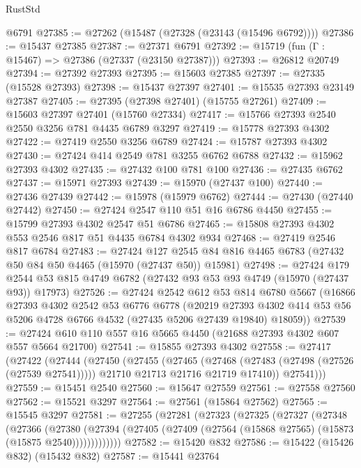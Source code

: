 \begin{lexlean}{RustStd}
\begin{coremodule}
    @6791
@27385 := @27262 (@15487 (@27328 (@23143 (@15496 @6792))))
@27386 := @15437 @27385
@27387 := @27371 @6791
@27392 := @15719 (fun (Γ : @15467) => @27386 (@27337 (@23150 @27387)))
@27393 := @26812 @20749
@27394 := @27392 @27393
@27395 := @15603 @27385
@27397 := @27335 (@15528 @27393)
@27398 := @15437 @27397
@27401 := @15535 @27393 @23149 @27387
@27405 := @27395 (@27398 @27401) (@15755 @27261)
@27409 := @15603 @27397 @27401 (@15760 @27334)
@27417 := @15766 @27393 @2540 @2550 @3256 @781 @4435 @6789 @3297
@27419 := @15778 @27393 @4302
@27422 := @27419 @2550 @3256 @6789
@27424 := @15787 @27393 @4302
@27430 := @27424 @414 @2549 @781 @3255 @6762 @6788
@27432 := @15962 @27393 @4302
@27435 := @27432 @100 @781 @100
@27436 := @27435 @6762
@27437 := @15971 @27393
@27439 := @15970 (@27437 @100)
@27440 := @27436 @27439
@27442 := @15978 (@15979 @6762)
@27444 := @27430 (@27440 @27442)
@27450 := @27424 @2547 @110 @51 @16 @6786 @4450
@27455 := @15799 @27393 @4302 @2547 @51 @6786
@27465 := @15808 @27393 @4302 @553 @2546 @817 @51 @4435 @6784 @4302 @934
@27468 := @27419 @2546 @817 @6784
@27483 := @27424
    @127
    @2545
    @84
    @816
    @4465
    @6783
    (@27432 @50 @84 @50 @4465 (@15970 (@27437 @50)) @15981)
@27498 := @27424
    @179
    @2544
    @53
    @815
    @4749
    @6782
    (@27432 @93 @53 @93 @4749 (@15970 (@27437 @93)) @17973)
@27526 := @27424
    @2542
    @612
    @53
    @814
    @6780
    @5667
    (@16866
      @27393
      @4302
      @2542
      @53
      @6776
      @6778
      (@20219
        @27393
        @4302
        @414
        @53
        @56
        @5206
        @4728
        @6766
        @4532
        (@27435 @5206 @27439 @19840)
        @18059))
@27539 := @27424 @610 @110 @557 @16 @5665 @4450 (@21688 @27393 @4302 @607 @557 @5664 @21700)
@27541 := @15855 @27393 @4302
@27558 := @27417
    (@27422
      (@27444
        (@27450
          (@27455
            (@27465
              (@27468 (@27483 (@27498 (@27526 (@27539 @27541)))))
              @21710
              @21713
              @21716
              @21719
              @17410))
          @27541)))
@27559 := @15451 @2540
@27560 := @15647 @27559
@27561 := @27558 @27560
@27562 := @15521 @3297
@27564 := @27561 (@15864 @27562)
@27565 := @15545 @3297
@27581 := @27255
    (@27281
      (@27323
        (@27325
          (@27327
            (@27348
              (@27366
                (@27380
                  (@27394 (@27405 (@27409 (@27564 (@15868 @27565) (@15873 (@15875 @2540)))))))))))))
@27582 := @15420 @832
@27586 := @15422 (@15426 @832) (@15432 @832)
@27587 := @15441 @23764

\end{coremodule}
\end{lexlean}
